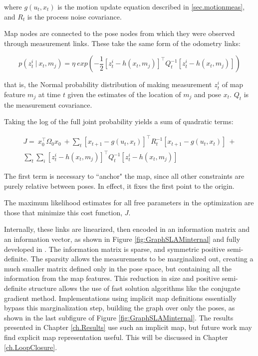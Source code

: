 where $g\left(u_t,x_t\right)$ is the motion update equation described in \ref{sec.motionmeas}, and $R_t$ is the process noise covariance.

Map nodes are connected to the pose nodes from which they were observed through measurement links. These take the same form of the odometry links:

\begin{equation}
p\left(z^i_{t}~|~x_t,m_j\right) = \eta~ exp\left(-\frac{1}{2}\left[z^i_{t} - h\left(x_t,m_j\right)\right]^{\intercal}Q_t^{-1}\left[z^i_{t} - h\left(x_t,m_j\right)\right]\right)
\end{equation}

that is, the Normal probability distribution of making measurement $z^i_t$ of map feature $m_j$ at time $t$ given the estimates of the location of $m_j$ and pose $x_t$. $Q_t$ is the measurement covariance. 

Taking the log of the full joint probability yields a sum of quadratic terms:

\begin{multline}
J = ~x_0^{\intercal}\Omega_0 x_0 ~+
\sum_{t}{\left[x_{t+1} - g\left(u_t,x_t\right)\right]^{\intercal}R_t^{-1}\left[x_{t+1} - g\left(u_t,x_t\right)\right]} ~+ \\ \sum_{t}{\sum_{i}{\left[z^i_{t} - h\left(x_t,m_j\right)\right]^{\intercal}Q_t^{-1}\left[z^i_{t} - h\left(x_t,m_j\right)\right]}}
\label{eq.quadcost}
\end{multline}

The first term is necessary to ``anchor" the map, since all other constraints are purely relative between poses. In effect, it fixes the first point to the origin. 

The maximum likelihood estimates for all free parameters in the optimization are those that minimize this cost function, $J$.

Internally, these links are linearized, then encoded in an information matrix and an information vector, as shown in Figure \ref{fig:GraphSLAMinternal} and fully developed in \cite{ref?}. The information matrix is sparse, and symmetric positive semi-definite. The sparsity allows the measurements to be marginalized out, creating a much smaller matrix defined only in the pose space, but containing all the information from the map features. This reduction in size and positive semi-definite structure allows the use of fast solution algorithms like the conjugate gradient method. Implementations using implicit map definitions essentially bypass this marginalization step, building the graph over only the poses, as shown in the last subfigure of Figure \ref{fig:GraphSLAMinternal}. The results presented in Chapter \ref{ch.Results} use such an implicit map, but future work may find explicit map representation useful. This will be discussed in Chapter \ref{ch.LoopClosure}.

